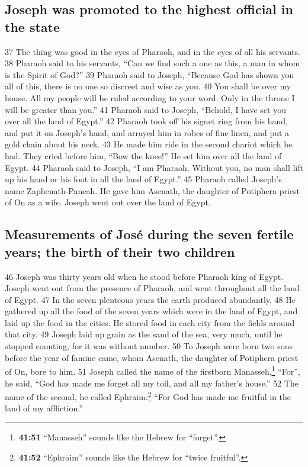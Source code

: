 \hypertarget{joseph-was-promoted-to-the-highest-official-in-the-state}{%
\subsection{Joseph was promoted to the highest official in the
state}\label{joseph-was-promoted-to-the-highest-official-in-the-state}}

{37} The thing was good in the eyes of Pharaoh, and in the eyes of all
his servants. {38} Pharaoh said to his servants, ``Can we find such a
one as this, a man in whom is the Spirit of God?'' {39} Pharaoh said to
Joseph, ``Because God has shown you all of this, there is no one so
discreet and wise as you. {40} You shall be over my house. All my people
will be ruled according to your word. Only in the throne I will be
greater than you.'' {41} Pharaoh said to Joseph, ``Behold, I have set
you over all the land of Egypt.'' {42} Pharaoh took off his signet ring
from his hand, and put it on Joseph's hand, and arrayed him in robes of
fine linen, and put a gold chain about his neck. {43} He made him ride
in the second chariot which he had. They cried before him, ``Bow the
knee!'' He set him over all the land of Egypt. {44} Pharaoh said to
Joseph, ``I am Pharaoh. Without you, no man shall lift up his hand or
his foot in all the land of Egypt.'' {45} Pharaoh called Joseph's name
Zaphenath-Paneah. He gave him Asenath, the daughter of Potiphera priest
of On as a wife. Joseph went out over the land of Egypt.

\hypertarget{measurements-of-josuxe9-during-the-seven-fertile-years-the-birth-of-their-two-children}{%
\subsection{Measurements of José during the seven fertile years; the
birth of their two
children}\label{measurements-of-josuxe9-during-the-seven-fertile-years-the-birth-of-their-two-children}}

{46} Joseph was thirty years old when he stood before Pharaoh king of
Egypt. Joseph went out from the presence of Pharaoh, and went throughout
all the land of Egypt. {47} In the seven plenteous years the earth
produced abundantly. {48} He gathered up all the food of the seven years
which were in the land of Egypt, and laid up the food in the cities. He
stored food in each city from the fields around that city. {49} Joseph
laid up grain as the sand of the sea, very much, until he stopped
counting, for it was without number. {50} To Joseph were born two sons
before the year of famine came, whom Asenath, the daughter of Potiphera
priest of On, bore to him. {51} Joseph called the name of the firstborn
Manasseh,\footnote{\textbf{41:51} ``Manasseh'' sounds like the Hebrew
  for ``forget''.} ``For'', he said, ``God has made me forget all my
toil, and all my father's house.'' {52} The name of the second, he
called Ephraim:\footnote{\textbf{41:52} ``Ephraim'' sounds like the
  Hebrew for ``twice fruitful''.} ``For God has made me fruitful in the
land of my affliction.''

